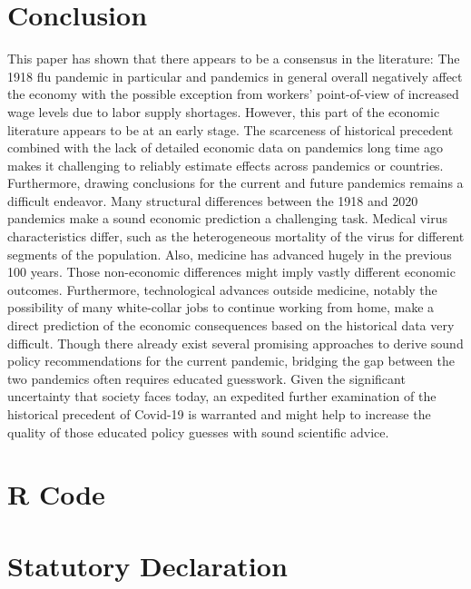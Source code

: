 \documentclass[12pt,a4paper]{article}
\begin{document}
\section{Conclusion}

This paper has shown that there appears to be a consensus in the literature: The 1918 flu pandemic in particular and pandemics in general overall negatively affect the economy with the possible exception from workers' point-of-view of increased wage levels due to labor supply shortages.
However, this part of the economic literature appears to be at an early stage.
The scarceness of historical precedent combined with the lack of detailed economic data on pandemics long time ago makes it challenging to reliably estimate effects across pandemics or countries.
Furthermore, drawing conclusions for the current and future pandemics remains a difficult endeavor.
Many structural differences between the 1918 and 2020 pandemics make a sound economic prediction a challenging task.
Medical virus characteristics differ, such as the heterogeneous mortality of the virus for different segments of the population.
Also, medicine has advanced hugely in the previous 100 years.
Those non-economic differences might imply vastly different economic outcomes.
Furthermore, technological advances outside medicine, notably the possibility of many white-collar jobs to continue working from home, make a direct prediction of the economic consequences based on the historical data very difficult.
Though there already exist several promising approaches to derive sound policy recommendations for the current pandemic, bridging the gap between the two pandemics often requires educated guesswork.
Given the significant uncertainty that society faces today, an expedited further examination of the historical precedent of Covid-19 is warranted and might help to increase the quality of those educated policy guesses with sound scientific advice.


\clearpage
\appendix
\section{R Code}



\clearpage


\newpage
\thispagestyle{empty}
\section*{Statutory Declaration}
\end{document}

